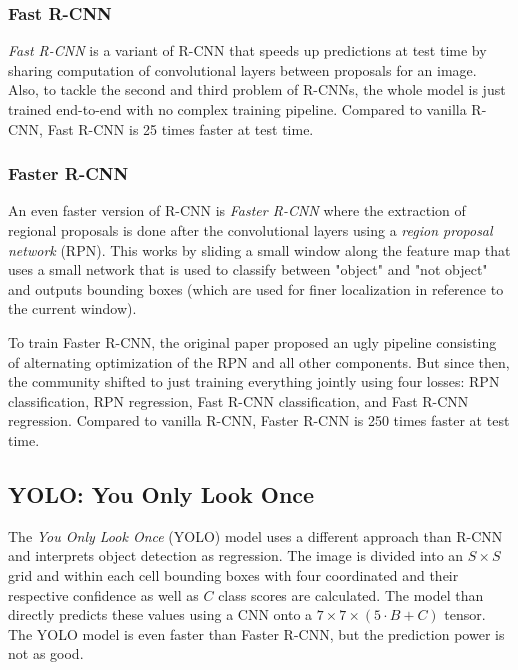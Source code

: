 			\subsubsection{Fast R-CNN}
				\emph{Fast R-CNN} is a variant of R-CNN that speeds up predictions at test time by sharing computation of convolutional layers between proposals for an image. Also, to tackle the second and third problem of R-CNNs, the whole model is just trained end-to-end with no complex training pipeline. Compared to vanilla R-CNN, Fast R-CNN is \num{25} times faster at test time.

			\subsubsection{Faster R-CNN}
				An even faster version of R-CNN is \emph{Faster R-CNN} where the extraction of regional proposals is done after the convolutional layers using a \emph{region proposal network} (RPN). This works by sliding a small window along the feature map that uses a small network that is used to classify between "object" and "not object" and outputs bounding boxes (which are used for finer localization in reference to the current window).

				To train Faster R-CNN, the original paper proposed an ugly pipeline consisting of alternating optimization of the RPN and all other components. But since then, the community shifted to just training everything jointly using four losses: RPN classification, RPN regression, Fast R-CNN classification, and Fast R-CNN regression. Compared to vanilla R-CNN, Faster R-CNN is \num{250} times faster at test time.

		\subsection{YOLO: You Only Look Once}
			The \emph{You Only Look Once} (YOLO) model uses a different approach than R-CNN and interprets object detection as regression. The image is divided into an \(S \times S\) grid and within each cell bounding boxes with four coordinated and their respective confidence as well as \(C\) class scores are calculated. The model than directly predicts these values using a CNN onto a \( 7 \times 7 \times (5 \cdot B + C) \) tensor. The YOLO model is even faster than Faster R-CNN, but the prediction power is not as good.

